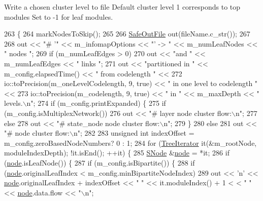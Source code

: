 Write a chosen cluster level to file Default cluster level 1 corresponds to top modules Set to -\/1 for leaf modules. 
\begin{DoxyCode}
263 \{
264     markNodesToSkip();
265 
266     \mbox{\hyperlink{classSafeOutFile}{SafeOutFile}} out(fileName.c\_str());
267 
268     out << \textcolor{stringliteral}{"# '"} << m\_infomapOptions << \textcolor{stringliteral}{"' -> "} << m\_numLeafNodes << \textcolor{stringliteral}{" nodes "};
269     \textcolor{keywordflow}{if} (m\_numLeafEdges > 0)
270         out << \textcolor{stringliteral}{"and "} << m\_numLeafEdges << \textcolor{stringliteral}{" links "};
271     out << \textcolor{stringliteral}{"partitioned in "} << m\_config.elapsedTime() << \textcolor{stringliteral}{" from codelength "} <<
272         io::toPrecision(m\_oneLevelCodelength, 9, \textcolor{keyword}{true}) << \textcolor{stringliteral}{" in one level to codelength "} <<
273         io::toPrecision(m\_codelength, 9, \textcolor{keyword}{true}) << \textcolor{stringliteral}{" in "} << m\_maxDepth << \textcolor{stringliteral}{" levels.\(\backslash\)n"};
274     \textcolor{keywordflow}{if} (m\_config.printExpanded) \{
275         \textcolor{keywordflow}{if} (m\_config.isMultiplexNetwork())
276             out << \textcolor{stringliteral}{"# layer node cluster flow:\(\backslash\)n"};
277         \textcolor{keywordflow}{else}
278             out << \textcolor{stringliteral}{"# state\_node node cluster flow:\(\backslash\)n"};
279     \}
280     \textcolor{keywordflow}{else}
281         out << \textcolor{stringliteral}{"# node cluster flow:\(\backslash\)n"};
282 
283     \textcolor{keywordtype}{unsigned} \textcolor{keywordtype}{int} indexOffset = m\_config.zeroBasedNodeNumbers? 0 : 1;
284     \textcolor{keywordflow}{for} (\mbox{\hyperlink{classTreeIterator}{TreeIterator}} it(&m\_rootNode, moduleIndexDepth); !it.isEnd(); ++it) \{
285         \mbox{\hyperlink{classSNode}{SNode}} &\mbox{\hyperlink{structnode}{node}} = *it;
286         \textcolor{keywordflow}{if} (\mbox{\hyperlink{structnode}{node}}.isLeafNode()) \{
287             \textcolor{keywordflow}{if} (m\_config.isBipartite()) \{
288                 \textcolor{keywordflow}{if} (\mbox{\hyperlink{structnode}{node}}.originalLeafIndex < m\_config.minBipartiteNodeIndex)
289                     out << \textcolor{charliteral}{'n'} << \mbox{\hyperlink{structnode}{node}}.originalLeafIndex + indexOffset << \textcolor{stringliteral}{" "} << it.moduleIndex() + 1 <
      < \textcolor{stringliteral}{" "} << \mbox{\hyperlink{structnode}{node}}.data.flow << \textcolor{stringliteral}{"\(\backslash\)n"};

\end{DoxyCode}
